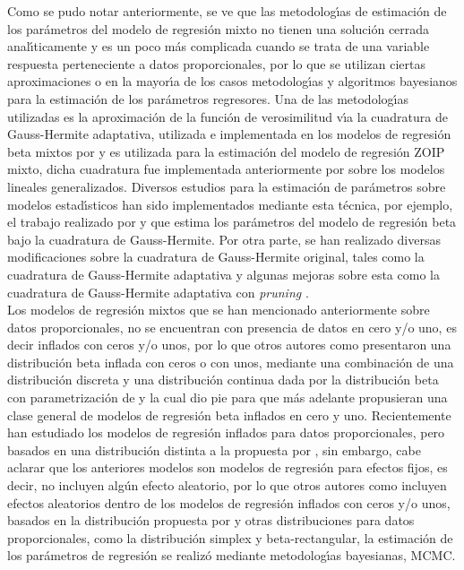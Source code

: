 Como se pudo notar anteriormente, se ve que las metodolog\'{\i}as de estimaci\'{o}n de los pa\-r\'{a}\-me\-tros del modelo de regresi\'{o}n mixto no tienen una soluci\'{o}n cerrada anal\'{\i}ticamente y es un poco m\'{a}s complicada cuando se trata de una variable respuesta perteneciente a datos proporcionales, por lo que se utilizan ciertas aproximaciones o en la mayor\'{\i}a de los casos metodolog\'{\i}as y algoritmos bayesianos para la estimaci\'{o}n de los par\'{a}metros regresores. Una de las metodolog\'{\i}as utilizadas es la aproximaci\'{o}n de la funci\'{o}n de verosimilitud v\'{\i}a la cuadratura de Gauss-Hermite adaptativa, utilizada e implementada en los modelos de regresi\'{o}n beta mixtos por \cite{Usuga1} y es utilizada para la estimaci\'{o}n del modelo de regresi\'{o}n ZOIP mixto, dicha cuadratura fue implementada anteriormente por \cite{Fahrmeir1} sobre los modelos lineales generalizados. Diversos estudios para la estimaci\'{o}n de par\'{a}metros sobre modelos estad\'{\i}sticos han sido implementados mediante esta t\'{e}cnica, por ejemplo, el trabajo realizado por \cite{Liu1} y \cite{Smithson1} que estima los par\'{a}metros del modelo de regresi\'{o}n beta bajo la cuadratura de Gauss-Hermite. Por otra parte, se han realizado diversas modificaciones sobre la cuadratura de Gauss-Hermite original, tales como la cuadratura de Gauss-Hermite adaptativa y algunas mejoras sobre esta como la cuadratura de Gauss-Hermite adaptativa con \textit{pruning} \citep{Hernandez1}.\\

Los modelos de regresi\'{o}n mixtos que se han mencionado anteriormente sobre datos proporcionales, no se encuentran con presencia de datos en cero y/o uno, es decir inflados con ceros y/o unos, por lo que otros autores como \cite{Ospina2} presentaron una distribuci\'{o}n beta inflada con ceros o con unos, mediante una combinaci\'{o}n de una distribuci\'{o}n discreta y una distribuci\'{o}n continua dada por la distribuci\'{o}n beta con parametrizaci\'{o}n de \cite{Ferrari2} y la cual dio pie para que m\'{a}s adelante \cite{Ospina1} propusieran una clase general de modelos de regresi\'{o}n beta inflados en cero y uno. Recientemente \cite{Kosmidis1} han estudiado los modelos de regresi\'{o}n inflados para datos proporcionales, pero basados en una distribuci\'{o}n distinta a la propuesta por \cite{Ospina1}, sin embargo, cabe aclarar que los anteriores modelos son modelos de regresi\'{o}n para efectos fijos, es decir, no incluyen alg\'{u}n efecto aleatorio, por lo que otros autores como \cite{Galvis1} incluyen efectos aleatorios dentro de los modelos de regresi\'{o}n inflados con ceros y/o unos, basados en la distribuci\'{o}n propuesta por \cite{Ospina2}y otras distribuciones para datos proporcionales, como la distribuci\'{o}n simplex y beta-rectangular, la estimaci\'{o}n de los par\'{a}metros de regresi\'{o}n se realiz\'{o} mediante metodolog\'{\i}as bayesianas, MCMC.\\

